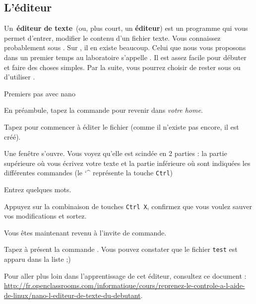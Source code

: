 \documentclass[a4paper,11pt]{style-esi/td}
\begin{document}
	\subsection{L'éditeur}

		Un \textbf{éditeur de texte} (ou, plus court, un \textbf{éditeur}) 
		est un programme qui vous permet d'entrer, modifier
		le contenu d'un fichier texte. 
		Vous connaissez probablement  sous . 
		Sur , il en existe beaucoup. 
		Celui que nous vous proposons dans un premier temps au laboratoire 
		s'appelle . 
		Il est assez facile pour débuter et faire des choses simples. 
		Par la suite, vous pourrez choisir de rester sous  
		ou d'utiliser .
		
	\newpage
		\begin{Tutoriel}{Premiers pas avec nano}
			\vspace{-1em}
			\begin{steps}
			\item 
				En préambule, tapez la commande  pour revenir dans \textit{votre home}.
			\item 
				Tapez  pour commencer à éditer le fichier  
				(comme il n'existe pas encore, il est créé).
			
				Une fenêtre s'ouvre. 
				Vous voyez qu'elle est scindée en 2 parties : 
				la partie supérieure où vous écrivez votre texte 
				et la partie inférieure où sont indiquées 
				les différentes commandes (le \char`\^{} représente la touche \verb|Ctrl|)
			\item 
				Entrez quelques mots.
			\item 
				Appuyez sur la combinaison de touches \verb|Ctrl X|, 
				confirmez que vous voulez sauver vos modifications et sortez.
			
				Vous êtes maintenant revenu à l'invite de commande.
			\item 
				Tapez à présent la commande .
				Vous pouvez constater que le fichier \verb_test_ est apparu dans la liste ;)
			\end{steps}
		\end{Tutoriel}

		Pour aller plus loin dans l'apprentissage de cet éditeur,
		consultez ce document :\\
		{\tiny\url{http://fr.openclassrooms.com/informatique/cours/reprenez-le-controle-a-l-aide-de-linux/nano-l-editeur-de-texte-du-debutant}}.
\end{document}

